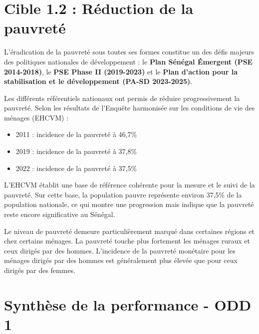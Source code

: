\section*{Cible 1.2 : Réduction de la pauvreté}

L’éradication de la pauvreté sous toutes ses formes constitue un des défis majeurs des politiques nationales de développement : le \textbf{Plan Sénégal Émergent (PSE 2014-2018)}, le \textbf{PSE Phase II (2019-2023)} et le \textbf{Plan d’action pour la stabilisation et le développement (PA-SD 2023-2025)}.


Les différents référentiels nationaux ont permis de réduire progressivement la pauvreté. Selon les résultats de l’Enquête harmonisée sur les conditions de vie des ménages (EHCVM) :  



\begin{itemize}
	\item 2011 : incidence de la pauvreté à 46,7\%
	\item 2019 : incidence de la pauvreté à 37,8\%
	\item 2022 : incidence de la pauvreté à 37,5\%
\end{itemize}

L’EHCVM établit une base de référence cohérente pour la mesure et le suivi de la pauvreté. Sur cette base, la population pauvre représente environ 37,5\% de la population nationale, ce qui montre une progression mais indique que la pauvreté reste encore significative au Sénégal.


Le niveau de pauvreté demeure particulièrement marqué dans certaines régions et chez certains ménages. La pauvreté touche plus fortement les ménages ruraux et ceux dirigés par des hommes. L’incidence de la pauvreté monétaire pour les ménages dirigés par des hommes est généralement plus élevée que pour ceux dirigés par des femmes.
\section*{Synthèse de la performance - ODD 1}

